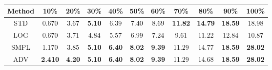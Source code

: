 \documentclass{standalone}
\begin{document}
\begin{tabular}{c|cccccccccc}
      \toprule
      Method & 10\% & 20\% & 30\% & 40\% & 50\% & 60\% & 70\% & 80\% & 90\% & 100\% \\
      \midrule
STD & 0.670 & 3.67 & \textbf{5.10} & 6.39 & 7.40 & 8.69 & \textbf{11.82} & \textbf{14.79} & \textbf{18.59} & 18.98\\
LOG & 0.670 & 3.71 & 4.84 & 5.57 & 6.99 & 7.24 & 9.61 & 11.22 & 12.84 & 10.87\\
SMPL & 1.170 & 3.85 & \textbf{5.10} & \textbf{6.40} & \textbf{8.02} & \textbf{9.39} & 11.29 & 14.77 & \textbf{18.59} & \textbf{28.02}\\
ADV & \textbf{2.410} & \textbf{4.20} & \textbf{5.10} & \textbf{6.40} & \textbf{8.02} & \textbf{9.39} & 11.29 & 14.68 & \textbf{18.59} & \textbf{28.02}\\
  \bottomrule
\end{tabular}
\end{document}
